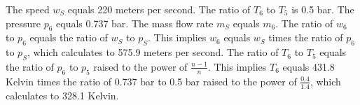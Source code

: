 The speed \( w_S \) equals 220 meters per second.
The ratio of \( T_6 \) to \( T_5 \) is 0.5 bar.
The pressure \( p_6 \) equals 0.737 bar.
The mass flow rate \( m_S \) equals \( m_6 \).
The ratio of \( w_6 \) to \( p_6 \) equals the ratio of \( w_S \) to \( p_S \).
This implies \( w_6 \) equals \( w_S \) times the ratio of \( p_6 \) to \( p_S \), which calculates to 575.9 meters per second.
The ratio of \( T_6 \) to \( T_5 \) equals the ratio of \( p_6 \) to \( p_5 \) raised to the power of \( \frac{n-1}{n} \).
This implies \( T_6 \) equals 431.8 Kelvin times the ratio of 0.737 bar to 0.5 bar raised to the power of \( \frac{0.4}{1.4} \), which calculates to 328.1 Kelvin.